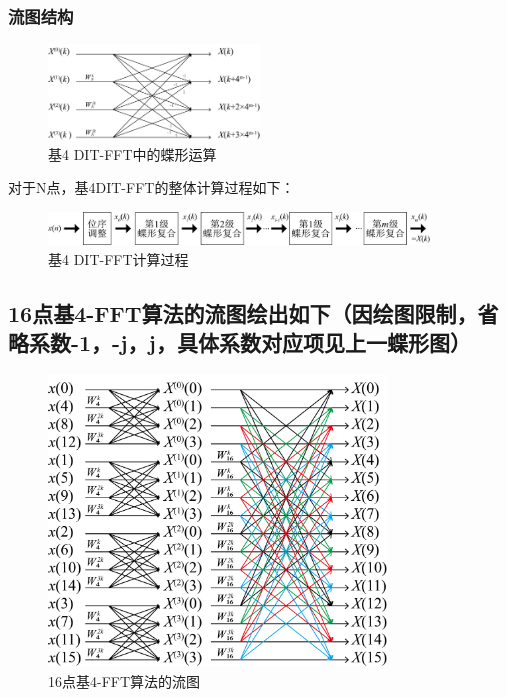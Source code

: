 \documentclass{../source/Experiment}
\begin{document}
            \subsubsection{流图结构}
            \begin{figure}[H]
                \centering
                \includegraphics[width = 0.5\textwidth]{pic/butterfly1.png}
                \caption{基4  DIT-FFT中的蝶形运算}
            \end{figure}
            对于N点，基4DIT-FFT的整体计算过程如下：
            \begin{figure}[H]
                \centering
                \includegraphics[width = 0.9\textwidth]{pic/butterfly2.png}
                \caption{基4  DIT-FFT计算过程}
            \end{figure}
        \subsection{16点基4-FFT算法的流图绘出如下（因绘图限制，省略系数-1，-j，j，具体系数对应项见上一蝶形图）}
        \begin{figure}[H]
            \centering
            \includegraphics[width = 0.8\textwidth]{pic/butterfly3.png}
            \caption{16点基4-FFT算法的流图}
        \end{figure}
\end{document}
